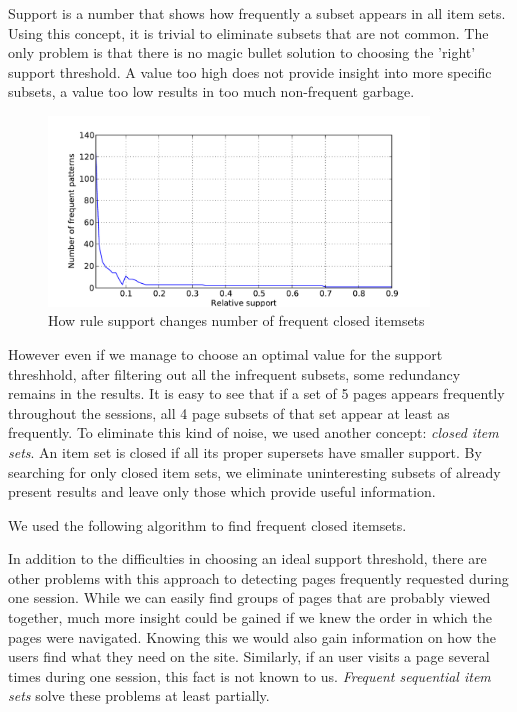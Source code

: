 \documentclass[english,a4paper]{article}
\begin{document}
Support is a number that shows how frequently a subset appears in all item sets. Using this concept, it is trivial to eliminate subsets that are not common. The only problem is that there is no magic bullet solution to choosing the 'right' support threshold. A value too high does not provide insight into more specific subsets, a value too low results in too much non-frequent garbage.
\begin{figure}[H]
  \centering
      \includegraphics[width=0.9\textwidth]{apriori_closed_itemset_count}
  \caption{How rule support changes number of frequent closed itemsets}
\end{figure}


However even if we manage to choose an optimal value for the support threshhold, after filtering out all the infrequent subsets, some redundancy remains in the results. It is easy to see that if a set of 5 pages appears frequently throughout the sessions, all 4 page subsets of that set appear at least as frequently. To eliminate this kind of noise, we used another concept: \emph{closed item sets}. An item set is closed if all its proper supersets have smaller support. By searching for only closed item sets, we eliminate uninteresting subsets of already present results and leave only those which provide useful information.

We used the following algorithm to find frequent closed itemsets.

In addition to the difficulties in choosing an ideal support threshold, there are other problems with this approach to detecting pages frequently requested during one session. While we can easily find groups of pages that are probably viewed together, much more insight could be gained if we knew the order in which the pages were navigated. Knowing this we would also gain information on how the users find what they need on the site. Similarly, if an user visits a page several times during one session, this fact is not known to us. \emph{Frequent sequential item sets} solve these problems at least partially.
\end{document}
